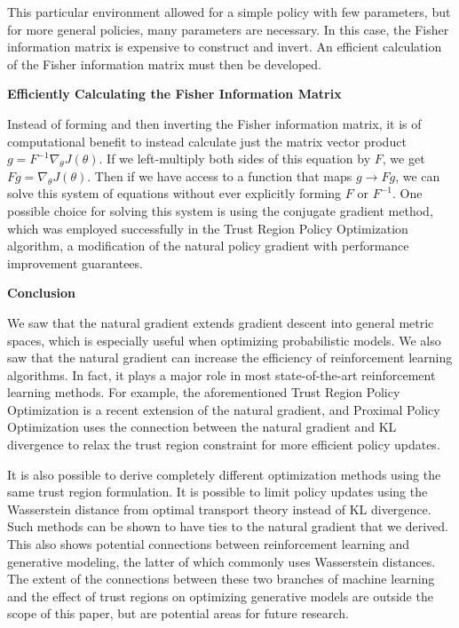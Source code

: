\documentclass[twoside,10pt]{article}
\newcommand{\subheader}[1]{\bigskip\begin{center}\textbf{#1}\end{center}}
\begin{document}
This particular environment allowed for a simple policy with few parameters, but for more general policies, many parameters are necessary. In this case, the Fisher information matrix is expensive to construct and invert. An efficient calculation of the Fisher information matrix must then be developed.

\subheader{Efficiently Calculating the Fisher Information Matrix}

Instead of forming and then inverting the Fisher information matrix, it is of computational benefit to instead calculate just the matrix vector product $g = F^{-1} \nabla_\theta J(\theta)$. If we left-multiply both sides of this equation by $F$, we get $F g = \nabla_\theta J(\theta)$. Then if we have access to a function that maps $g \to F g$, we can solve this system of equations without ever explicitly forming $F$ or $F^{-1}$. One possible choice for solving this system is using the conjugate gradient method, which was employed successfully in the Trust Region Policy Optimization algorithm, a modification of the natural policy gradient with performance improvement guarantees.\cite{trpo}

\subheader{Conclusion}

We saw that the natural gradient extends gradient descent into general metric spaces, which is especially useful when optimizing probabilistic models. We also saw that the natural gradient can increase the efficiency of reinforcement learning algorithms. In fact, it plays a major role in most state-of-the-art reinforcement learning methods. For example, the aforementioned Trust Region Policy Optimization is a recent extension of the natural gradient,\cite{trpo} and Proximal Policy Optimization uses the connection between the natural gradient and KL divergence to relax the trust region constraint for more efficient policy updates.\cite{ppo}

It is also possible to derive completely different optimization methods using the same trust region formulation. It is possible to limit policy updates using the Wasserstein distance from optimal transport theory instead of KL divergence.\cite{wgf} Such methods can be shown to have ties to the natural gradient that we derived.\cite{ng-ot} This also shows potential connections between reinforcement learning and generative modeling, the latter of which commonly uses Wasserstein distances. The extent of the connections between these two branches of machine learning and the effect of trust regions on optimizing generative models are outside the scope of this paper, but are potential areas for future research.
\end{document}
